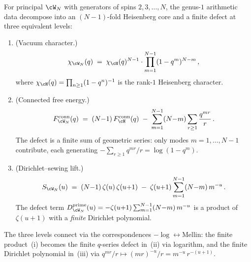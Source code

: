 \begin{theorem}%
\label{thm:finite-miura-defect}%
%
%
%
For principal $\cW_N$ with generators of spins
$2, 3, \ldots, N$, the genus-$1$ arithmetic data
decompose into an $(N{-}1)$-fold Heisenberg core and
a finite defect at three equivalent levels\textup{:}
\begin{enumerate}[label=\textup{(\roman*)}]
\item
\textup{(}Vacuum character.\textup{)}
\begin{equation}\label{eq:vacuum-character-splitting}
\chi_{\cW_N}(q)
\;=\;
\chi_\cH(q)^{N-1}
\cdot
\prod_{m=1}^{N-1}(1 - q^m)^{N-m}\,,
\end{equation}
where $\chi_\cH(q) = \prod_{n \geq 1}(1 - q^n)^{-1}$
is the rank-$1$ Heisenberg character.
\item
\textup{(}Connected free energy.\textup{)}
\begin{equation}\label{eq:connected-free-energy-splitting}
F_{\cW_N}^{\mathrm{conn}}(q)
\;=\;
(N{-}1)\,F_\cH^{\mathrm{conn}}(q)
\;-\;
\sum_{m=1}^{N-1}(N{-}m)\sum_{r \geq 1}
\frac{q^{mr}}{r}\,.
\end{equation}
The defect is a finite sum of geometric series\textup{:}
only modes $m = 1, \ldots, N{-}1$ contribute, each generating
$-\sum_{r \geq 1} q^{mr}/r = \log(1 - q^m)$.
\item
\textup{(}Dirichlet--sewing lift.\textup{)}
\begin{equation}\label{eq:dirichlet-defect-splitting}
S_{\cW_N}(u)
\;=\;
(N{-}1)\,\zeta(u)\,\zeta(u{+}1)
\;-\;
\zeta(u{+}1)\sum_{m=1}^{N-1}(N{-}m)\,m^{-u}\,.
\end{equation}
The defect term
$D_{\cW_N}^{\mathrm{prime}}(u)
= -\zeta(u{+}1)\sum_{m=1}^{N-1}(N{-}m)\,m^{-u}$
is a product of $\zeta(u{+}1)$ with a \emph{finite}
Dirichlet polynomial.
\end{enumerate}
The three levels connect via the correspondences
$-\log \leftrightarrow \mathrm{Mellin}$\textup{:}
the finite product~\textup{(i)} becomes the finite
$q$-series defect in~\textup{(ii)} via logarithm, and
the finite Dirichlet polynomial in~\textup{(iii)} via
$q^{mr}/r \mapsto (mr)^{-u}/r = m^{-u}\,r^{-(u+1)}$.
\end{theorem}

